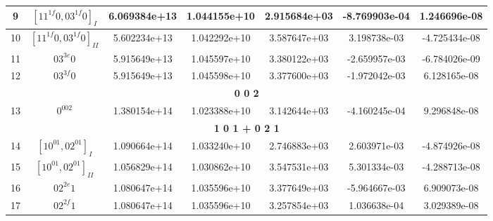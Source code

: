 \begin{table}[h!]
\begin{tabular}{|c|c|c|c|c|c|c|}
9 & $[11^{1f}0, 03^{1f}0]_{I}$ & 6.069384e+13 & 1.044155e+10 & 2.915684e+03 & -8.769903e-04 & 1.246696e-08 \\ \hline
10 & $[11^{1f}0, 03^{1f}0]_{II}$ & 5.602234e+13 & 1.042292e+10 & 3.587647e+03 & 3.198738e-03 & -4.725434e-08 \\ \hline
11 & $03^{3e}0$ & 5.915649e+13 & 1.045597e+10 & 3.380122e+03 & -2.659957e-03 & -6.784026e-09 \\ \hline
12 & $03^{3f}0$ & 5.915649e+13 & 1.045598e+10 & 3.377600e+03 & -1.972042e-03 & 6.128165e-08 \\ \hline
\multicolumn{7}{|c|}{\textbf{0 0 2}} \\ \hline
13 & $0^002$ & 1.380154e+14 & 1.023388e+10 & 3.142644e+03 & -4.160245e-04 & 9.296848e-08 \\ \hline
\multicolumn{7}{|c|}{\textbf{1 0 1 + 0 2 1}} \\ \hline
14 & $[10^01, 02^01]_{I}$ & 1.090664e+14 & 1.033240e+10 & 2.746883e+03 & 2.603971e-03 & -4.874926e-08 \\ \hline
15 & $[10^01, 02^01]_{II}$ & 1.056829e+14 & 1.030862e+10 & 3.547531e+03 & 5.301334e-03 & -4.288713e-08 \\ \hline
16 & $02^{2e}1$ & 1.080647e+14 & 1.035596e+10 & 3.377649e+03 & -5.964667e-03 & 6.909073e-08 \\ \hline
17 & $02^{2f}1$ & 1.080647e+14 & 1.035596e+10 & 3.257854e+03 & 1.036638e-04 & 3.029389e-08 \\ \hline
\end{tabular}
\end{table}



